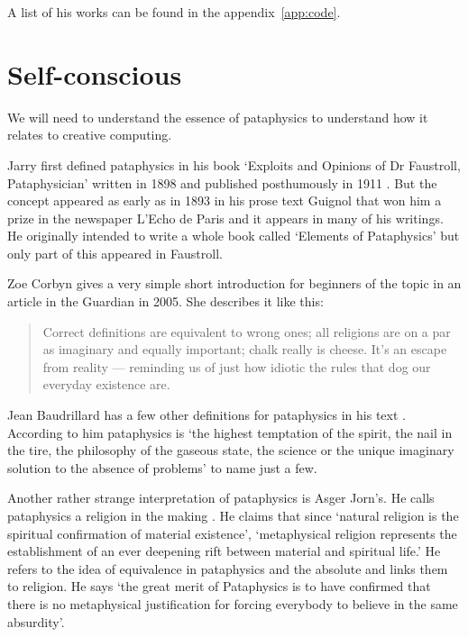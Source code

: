 A list of his works can be found in the appendix~\ref{app:code}.


\section{Self-conscious}

We will need to understand the essence of pataphysics to understand how it relates to creative computing.

Jarry first defined pataphysics in his book `Exploits and Opinions of Dr Faustroll, Pataphysician' written in 1898 and published posthumously in 1911 \autocite{Jarry1996}. But the concept appeared as early as in 1893 in his prose text Guignol that won him a prize in the newspaper L'Echo de Paris and it appears in many of his writings. He originally intended to write a whole book called `Elements of Pataphysics' but only part of this appeared in Faustroll.

Zoe Corbyn gives a very simple short introduction for beginners of the topic in an article in the Guardian \autocite{Corbyn2005} in 2005. She describes it like this:

\begin{quotation}
  Correct definitions are equivalent to wrong ones; all religions are on a par as imaginary and equally important; chalk really is cheese. It's an escape from reality --- reminding us of just how idiotic the rules that dog our everyday existence are. 
\end{quotation}

Jean Baudrillard has a few other definitions for pataphysics in his text \autocite{Baudrillard2007}. According to him pataphysics is `the highest temptation of the spirit, the nail in the tire, the philosophy of the gaseous state, the science or the unique imaginary solution to the absence of problems' to name just a few.

Another rather strange interpretation of pataphysics is Asger Jorn's. He calls pataphysics a religion in the making \autocite{Jorn1961}. He claims that since `natural religion is the spiritual confirmation of material existence', `metaphysical religion represents the establishment of an ever deepening rift between material and spiritual life.' He refers to the idea of equivalence in pataphysics and the absolute and links them to religion. He says `the great merit of Pataphysics is to have confirmed that there is no metaphysical justification for forcing everybody to believe in the same absurdity'.

